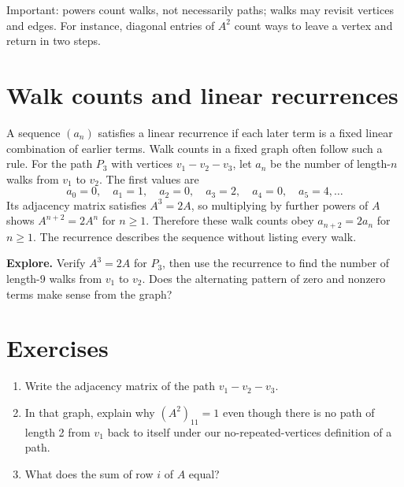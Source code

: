 Important: powers count walks, not necessarily paths; walks may revisit vertices and edges. For instance, diagonal entries of $A^2$ count ways to leave a vertex and return in two steps.

\section*{\Enrichment{} Walk counts and linear recurrences}
A sequence $(a_n)$ satisfies a linear recurrence if each later term is a fixed linear combination of earlier terms. Walk counts in a fixed graph often follow such a rule. For the path $P_3$ with vertices $v_1-v_2-v_3$, let $a_n$ be the number of length-$n$ walks from $v_1$ to $v_2$. The first values are
\[
a_0=0,\quad a_1=1,\quad a_2=0,\quad a_3=2,\quad a_4=0,\quad a_5=4,\ldots
\]
Its adjacency matrix satisfies $A^3=2A$, so multiplying by further powers of $A$ shows $A^{n+2}=2A^n$ for $n\geq 1$. Therefore these walk counts obey $a_{n+2}=2a_n$ for $n\geq 1$. The recurrence describes the sequence without listing every walk.

\textbf{Explore.} Verify $A^3=2A$ for $P_3$, then use the recurrence to find the number of length-9 walks from $v_1$ to $v_2$. Does the alternating pattern of zero and nonzero terms make sense from the graph?

\section*{Exercises}
\begin{enumerate}
\item Write the adjacency matrix of the path $v_1-v_2-v_3$.
\item In that graph, explain why $(A^2)_{11}=1$ even though there is no path of length 2 from $v_1$ back to itself under our no-repeated-vertices definition of a path.
\item What does the sum of row $i$ of $A$ equal?
\end{enumerate}
